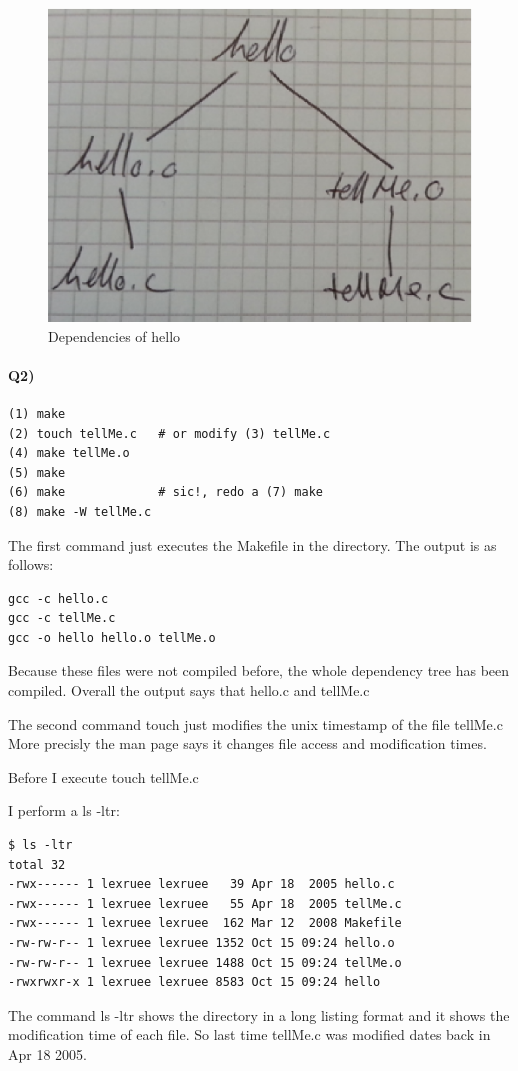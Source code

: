 \documentclass[12pt]{article}
\begin{document}
\begin{figure}[!htb]
\centering
\includegraphics[scale=0.5]{make_dep_q1.eps} 
\caption{Dependencies of hello}
\end{figure}

\paragraph{Q2)}
\begin{lstlisting}
(1) make
(2) touch tellMe.c   # or modify (3) tellMe.c
(4) make tellMe.o
(5) make
(6) make             # sic!, redo a (7) make
(8) make -W tellMe.c
\end{lstlisting}

The first command just executes the Makefile in the directory.
The output is as follows:
\begin{lstlisting}
gcc -c hello.c
gcc -c tellMe.c
gcc -o hello hello.o tellMe.o
\end{lstlisting}
Because these files were not compiled before, the whole dependency tree has been compiled.
Overall the output says that hello.c and tellMe.c

The second command touch just modifies the unix timestamp of the file tellMe.c 
More precisly the man page says it changes file access and modification times.

Before I execute touch tellMe.c

I perform a ls -ltr:
\begin{lstlisting}
$ ls -ltr
total 32
-rwx------ 1 lexruee lexruee   39 Apr 18  2005 hello.c
-rwx------ 1 lexruee lexruee   55 Apr 18  2005 tellMe.c
-rwx------ 1 lexruee lexruee  162 Mar 12  2008 Makefile
-rw-rw-r-- 1 lexruee lexruee 1352 Oct 15 09:24 hello.o
-rw-rw-r-- 1 lexruee lexruee 1488 Oct 15 09:24 tellMe.o
-rwxrwxr-x 1 lexruee lexruee 8583 Oct 15 09:24 hello
\end{lstlisting}
The command ls -ltr shows the directory in a long listing format and it shows the modification time of each file. So last time tellMe.c was modified dates back in Apr 18  2005.
\end{document}
